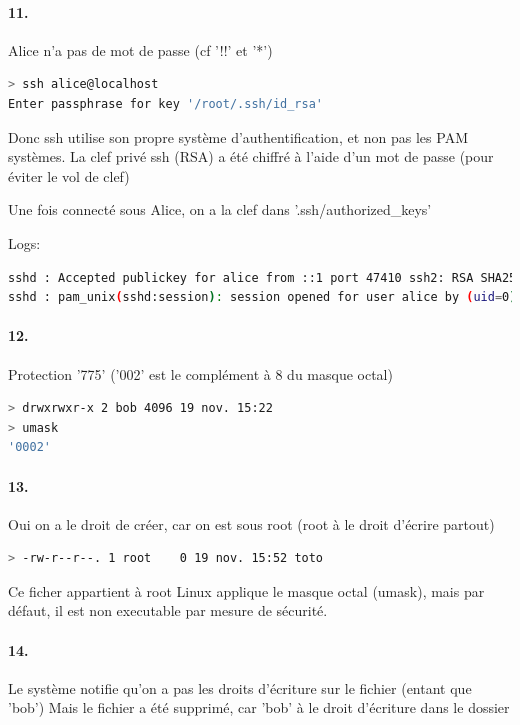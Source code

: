 \documentclass[10pt]{article}
\begin{document}
        \paragraph{11.} Alice n'a pas de mot de passe (cf '!!' et '*')
        
\begin{lstlisting}[language=bash]
> ssh alice@localhost
Enter passphrase for key '/root/.ssh/id_rsa'
\end{lstlisting}

Donc ssh utilise son propre système d'authentification, et non pas les PAM systèmes.
La clef privé ssh (RSA) a été chiffré à l'aide d'un mot de passe (pour éviter le vol de clef)

Une fois connecté sous Alice, on a la clef dans '.ssh/authorized\_keys'

Logs:
\begin{lstlisting}[language=bash]
sshd : Accepted publickey for alice from ::1 port 47410 ssh2: RSA SHA256:/JdhKRDYT.....
sshd : pam_unix(sshd:session): session opened for user alice by (uid=0)
\end{lstlisting}

        \paragraph{12.} Protection '775' ('002' est le complément à 8 du masque octal)

\begin{lstlisting}[language=bash]
> drwxrwxr-x 2 bob 4096 19 nov. 15:22
> umask
'0002'
\end{lstlisting}

        \paragraph{13.}
        
Oui on a le droit de créer, car on est sous root (root à le droit d'écrire partout)
\begin{lstlisting}[language=bash]
> -rw-r--r--. 1 root    0 19 nov. 15:52 toto
\end{lstlisting}

Ce ficher appartient à root
Linux applique le masque octal (umask), mais par défaut, il est non executable par mesure de sécurité.

\paragraph{14.} Le système notifie qu'on a pas les droits d'écriture sur le fichier (entant que 'bob')
Mais le fichier a été supprimé, car 'bob' à le droit d'écriture dans le dossier
\end{document}
